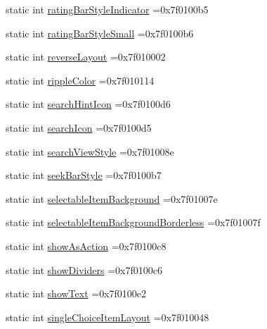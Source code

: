 \begin{DoxyCompactItemize}
\item 
static int \hyperlink{classandroid_1_1support_1_1v7_1_1cardview_1_1R_1_1attr_a5b7894890d0ccca978ea0fc38f92c66e}{rating\+Bar\+Style\+Indicator} =0x7f0100b5
\item 
static int \hyperlink{classandroid_1_1support_1_1v7_1_1cardview_1_1R_1_1attr_afa8d9e5d9fb40c29dc437120e60494a8}{rating\+Bar\+Style\+Small} =0x7f0100b6
\item 
static int \hyperlink{classandroid_1_1support_1_1v7_1_1cardview_1_1R_1_1attr_a8d57994b6f18c9cf3b202b8b54d95809}{reverse\+Layout} =0x7f010002
\item 
static int \hyperlink{classandroid_1_1support_1_1v7_1_1cardview_1_1R_1_1attr_ae44c13dbe37d775ac8c669226c28d6cf}{ripple\+Color} =0x7f010114
\item 
static int \hyperlink{classandroid_1_1support_1_1v7_1_1cardview_1_1R_1_1attr_abd1a6922795d8eb2f926d5ce77d1e192}{search\+Hint\+Icon} =0x7f0100d6
\item 
static int \hyperlink{classandroid_1_1support_1_1v7_1_1cardview_1_1R_1_1attr_a50c88825d8b7297a04320d1b339090dd}{search\+Icon} =0x7f0100d5
\item 
static int \hyperlink{classandroid_1_1support_1_1v7_1_1cardview_1_1R_1_1attr_a4054d03c18a6e9d5e84784de333be406}{search\+View\+Style} =0x7f01008e
\item 
static int \hyperlink{classandroid_1_1support_1_1v7_1_1cardview_1_1R_1_1attr_a4b3940a1b30e07edae0bc72456dd2944}{seek\+Bar\+Style} =0x7f0100b7
\item 
static int \hyperlink{classandroid_1_1support_1_1v7_1_1cardview_1_1R_1_1attr_ac1c9dfc901b203e19b077f8cb3add743}{selectable\+Item\+Background} =0x7f01007e
\item 
static int \hyperlink{classandroid_1_1support_1_1v7_1_1cardview_1_1R_1_1attr_abb688460f8a982ff21259f7207979ee1}{selectable\+Item\+Background\+Borderless} =0x7f01007f
\item 
static int \hyperlink{classandroid_1_1support_1_1v7_1_1cardview_1_1R_1_1attr_a895b2c4c5e40bf53be20402ec2dcd9a7}{show\+As\+Action} =0x7f0100c8
\item 
static int \hyperlink{classandroid_1_1support_1_1v7_1_1cardview_1_1R_1_1attr_aee3b93a16dbd1e9064e91302644b0209}{show\+Dividers} =0x7f0100c6
\item 
static int \hyperlink{classandroid_1_1support_1_1v7_1_1cardview_1_1R_1_1attr_a6d1cb415e3b1eef3bcb5ec2ac578c03a}{show\+Text} =0x7f0100e2
\item 
static int \hyperlink{classandroid_1_1support_1_1v7_1_1cardview_1_1R_1_1attr_a02adf6c7fe6e46d761997a19ab266467}{single\+Choice\+Item\+Layout} =0x7f010048

\end{DoxyCompactItemize}
